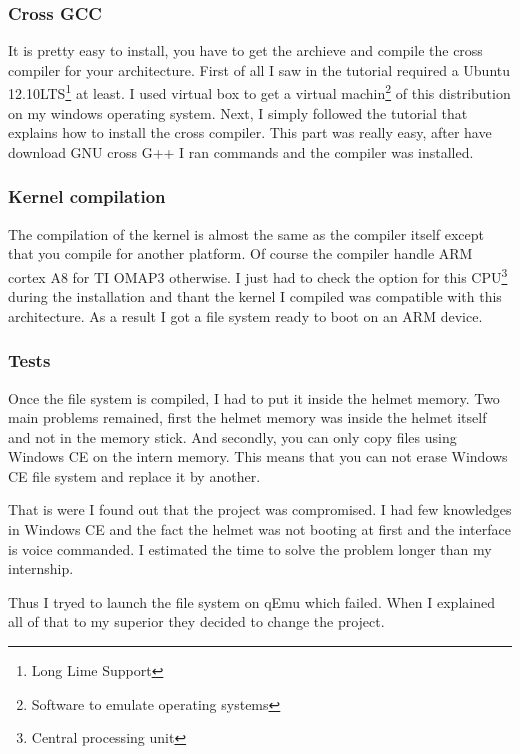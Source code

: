 	\subsubsection{Cross GCC}
	
	\par It is pretty easy to install, you have to get the archieve and compile the cross compiler for your architecture. First of all I saw in the tutorial required a Ubuntu 12.10LTS\footnote{Long Lime Support} at least. I used virtual box to get a virtual machin\footnote{Software to emulate operating systems} of this distribution on my windows operating system. Next, I simply followed the tutorial that explains how to install the cross compiler. This part was really easy, after have download GNU cross G++ I ran commands and the compiler was installed.
	
	\subsubsection{Kernel compilation}
	
	\par The compilation of the kernel is almost the same as the compiler itself except that you compile for another platform. Of course the compiler handle ARM cortex A8 for TI OMAP3 otherwise. I just had to check the option for this CPU\footnote{Central processing unit} during the installation and thant the kernel I compiled was compatible with this architecture. As a result I got a file system ready to boot on an ARM device.
	
	
	\subsubsection{Tests}
	
	\par Once the file system is compiled, I had to put it inside the helmet memory. Two main problems remained, first the helmet memory was inside the helmet itself and not in the memory stick. And secondly, you can only copy files using Windows CE on the intern memory. This means that you can not erase Windows CE file system and replace it by another.
	\par That is were I found out that the project was compromised. I had few knowledges in Windows CE and the fact the helmet was not booting at first and the interface is voice commanded. I estimated the time to solve the problem longer than my internship.
	\par Thus I tryed to launch the file system on qEmu which failed. When I explained all of that to my superior they decided to change the project.
	
